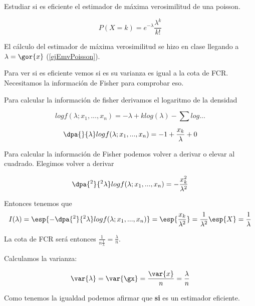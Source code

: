 \begin{problem}[4]
Estudiar si es eficiente el estimador de máxima verosimilitud de una poisson.
\solution

\[ P(X = k) = e^{-\lambda} \frac{\lambda^{k}}{k!} \]

El cálculo del estimador de máxima verosimilitud se hizo en clase llegando a $\lambda = \gor{x}$ (\ref{ejEmvPoisson}).

Para ver si es eficiente vemos si es su varianza es igual a la cota de FCR. Necesitamos la información de Fisher para comprobar eso.

Para calcular la información de fisher derivamos el logaritmo de la densidad

\[log f(\lambda;x_1,...,x_n) = -\lambda + k log(\lambda) - \sum log...\]

\[\dpa{}{\lambda} log f (\lambda;x_1,...,x_n) = - 1 + \frac{x_k}{\lambda} + 0\]

Para calcular la información de Fisher podemos volver a derivar o elevar al cuadrado. Elegimos volver a derivar

\[\dpa{^2}{^2\lambda} log f (\lambda;x_1,...,x_n) = -\frac{x_k^2}{\lambda^2}\]

Entonces tenemos que \[I(\lambda) = \esp{-\dpa{^2}{^2\lambda} log f (\lambda;x_1,...,x_n)} = \esp{\frac{x_k}{\lambda^2}} = \frac{1}{\lambda^2}\esp{X} = \frac{1}{\lambda}\]

La cota de FCR será entonces $\displaystyle\frac{1}{n\frac{1}{\lambda}} = \frac{\lambda}{n}$.

Calculamos la varianza:

\[\var{\lambda} = \var{\gx} = \frac{\var{x}}{n} = \frac{\lambda}{n}\]

Como tenemos la igualdad podemos afirmar que \textbf{si} es un estimador eficiente.
\end{problem}

